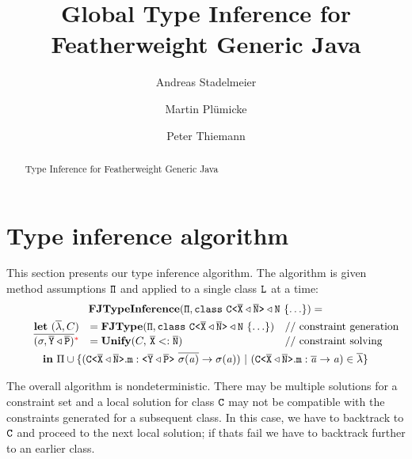 \documentclass[a4paper,USenglish,cleveref, autoref, thm-restate, anonymous]{lipics-v2021}
\title{Global Type Inference for Featherweight Generic Java} %
\author{Andreas Stadelmeier}{DHBW Stuttgart, Campus Horb, Germany}{a.stadelmeier@hb.dhbw-stuttgart.de}{}{}%
\author{Martin Plümicke}{DHBW Stuttgart, Campus Horb, Germany}{pl@dhbw.de}{}{}
\author{Peter Thiemann}{Universität Freiburg, Institut für Informatik, Germany}{thiemann@informatik.uni-freiburg.de}{}{}
\begin{document}
\maketitle

\begin{abstract}
  Type Inference for Featherweight Generic Java
\end{abstract}









\section{Type inference algorithm}
\label{sec:type-infer-algor}
This section presents our type inference algorithm.
The algorithm is given method assumptions ${\tt \Pi}$ and applied to a
single class ${\tt L}$ at a time:
\begin{gather*}
\fjtypeinference(\mv{\Pi}, \texttt{class}\ \exptype{C}{\ol{X}
\triangleleft \ol{N}} \triangleleft \type{N}\ \{ \ldots \}) = \\
\quad \quad \begin{array}[t]{rll}
  \textbf{let}\ 
  (\overline{\methodAssumption}, \consSet) &= \fjtype{}(\mv{\Pi}, \texttt{class}\ \exptype{C}{\ol{X}
  \triangleleft \ol{N}} \triangleleft \type{N}\ \{ \ldots \}) &
                                                                     \text{// constraint generation}\\
  \overline{(\sigma,  \ol{Y} \triangleleft \ol{P})}\commentarymark &= \unify{}(\consSet,\, \ol{X} <: \ol{N}) & \text{// constraint solving}\\
\end{array}\\
\textbf{in}\ \mtypeEnvironment \cup
\set{(\exptype{C}{\ol{X} \triangleleft \ol{N}}.\mv{m} : \exptype{}{\ol{Y} \triangleleft \ol{P}}\ \ol{\sigma(\tv{a})} \to \sigma(\tv{a})) \ |\ (\exptype{C}{\ol{X} \triangleleft \ol{N}}.\mv{m} : \ol{\tv{a}} \to \tv{a}) \in \overline{\methodAssumption}}
\end{gather*}

The overall algorithm is nondeterministic. There may be multiple solutions for a constraint set and a local solution for class ${\tt C}$ may not
be compatible with the constraints generated for a subsequent class. In this case, we have to backtrack to ${\tt C}$ and proceed to the next
local solution; if thats fail we have to backtrack further to an earlier class.
\end{document}
